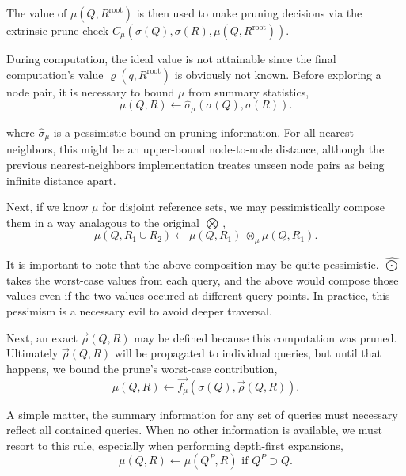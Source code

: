 \documentclass[twoside,leqno,twocolumn]{article}
\newcommand{\authornote}[1]{\footnote{Note to self: #1}}
\newcommand{\union}{\cup}
\newcommand{\summary}{\hat{\sigma}}
\newcommand{\kdroot}[1]{#1^{\text{root}}}
\newcommand{\kdparent}[1]{#1^{\!P}}
\newcommand{\nameOp}[2]{\mathop{#1\nolimits\!\!_{#2}}}
\newcommand{\nameop}[2]{{\scriptstyle\:}#1_{\!#2}}
\newcommand{\myOp}[1]{\nameOp{\bigotimes}{#1}}
\newcommand{\myop}[1]{\nameop{\otimes}{#1}}
\newcommand{\letterqr}{\rho}
\newcommand{\outqr}{\varrho}
\newcommand{\Opqr}{\myOp{\letterqr}}
\newcommand{\inqrv}{\vec{\rho}}
\newcommand{\lettermu}{\mu}
\newcommand{\inmu}{\mu}
\newcommand{\Outopmu}{\widehat{\nameOp{\bigodot}{\lettermu}}}%
\newcommand{\opmu}{\myop{\lettermu}}
\newcommand{\fmuv}{\vec{f_{\!\lettermu}}}
\newcommand{\deltamu}{\summary_{\!\lettermu}}
\newcommand{\canprunemu}{C_{\!\lettermu}}
\newcommand{\outstat}{\sigma}
\begin{document}
\noindent
The value of $\inmu(Q, \kdroot{R})$ is then used to make pruning decisions via the extrinsic prune check $\canprunemu(\outstat(Q), \outstat(R), \inmu(Q, \kdroot{R}))$.

During computation, the ideal value is not attainable since the final computation's value $\outqr(q, \kdroot{R})$ is obviously not known.
Before exploring a node pair, it is necessary to bound $\inmu$ from summary statistics,
\begin{equation}
\inmu(Q, R) \gets \deltamu(\outstat(Q), \outstat(R)).
\label{eqn:mudelta}
\end{equation}

\noindent
where $\deltamu$ is a pessimistic bound on pruning information.
For all nearest neighbors, this might be an upper-bound node-to-node distance, although the previous nearest-neighbors implementation treates unseen node pairs as being infinite distance apart.

Next, if we know $\inmu$ for disjoint reference sets, we may pessimistically compose them in a way analagous to the original $\Opqr$,
\begin{equation}
\inmu(Q, R_1 \union R_2) \gets \inmu(Q, R_1) \opmu \inmu(Q, R_1).
\label{eqn:mucompose}
\end{equation}

\noindent
It is important to note that the above composition may be quite pessimistic.
$\Outopmu$ takes the worst-case values from each query, and the above would compose those values even if the two values occured at different query points.
In practice, this pessimism is a necessary evil to avoid deeper traversal.

Next, an exact $\inqrv(Q, R)$ may be defined because this computation was pruned.
Ultimately $\inqrv(Q, R)$ will be propagated to individual queries, but until that happens, we bound the prune's worst-case contribution,
\begin{equation}
\inmu(Q, R) \gets \fmuv(\outstat(Q), \inqrv(Q, R)).
\label{eqn:muprune}
\end{equation}

\noindent
A simple matter, the summary information for any set of queries must necessary reflect all contained queries.
When no other information is available, we must resort to this rule, especially when performing depth-first expansions,
\begin{equation}
\inmu(Q, R) \gets \inmu(\kdparent{Q}, R) \text{ if } \kdparent{Q} \supset Q.
\label{eqn:muparent}
\end{equation}
\end{document}
